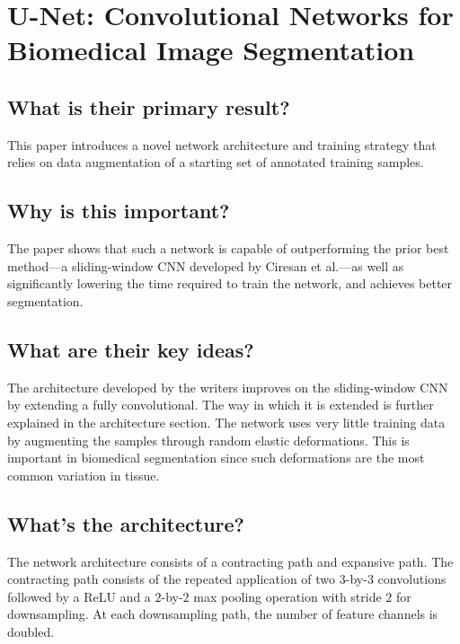 \section{U-Net: Convolutional Networks for Biomedical Image Segmentation}

\subsection*{What is their primary result?}
This paper introduces a novel network architecture and training strategy that
relies on data augmentation of a starting set of annotated training samples.

\subsection*{Why is this important?}
The paper shows that such a network is capable of outperforming the prior best
method---a sliding-window CNN developed by Ciresan et al.---as well as
significantly lowering the time required to train the network, and achieves
better segmentation.

\subsection*{What are their key ideas?}
The architecture developed by the writers improves on the sliding-window CNN by
extending a fully convolutional. The way in which it is extended is further
explained in the architecture section. The network uses very little training
data by augmenting the samples through random elastic deformations. This is
important in biomedical segmentation since such deformations are the most common
variation in tissue.



\subsection*{What's the architecture?}
The network architecture consists of a contracting path and expansive path. The
contracting path consists of the repeated application of two $3$-by-$3$
convolutions followed by a ReLU and a $2$-by-$2$ max pooling operation with
stride $2$ for downsampling. At each downsampling path, the number of feature
channels is doubled.

